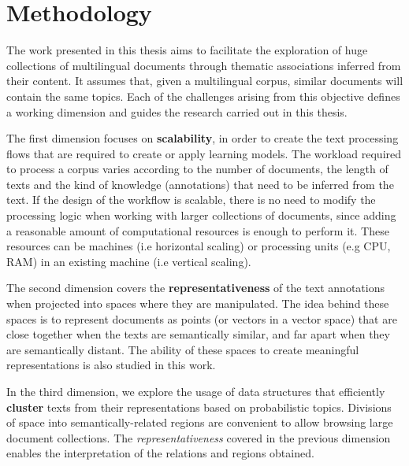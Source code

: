 

\chapter{Methodology}
\label{ch:hypothesis}

\graphicspath{{hypothesis/figures/}}


The work presented in this thesis aims to facilitate the exploration of huge collections of multilingual documents through thematic associations inferred from their content. It assumes that, given a multilingual corpus, similar documents will contain the same topics. Each of the challenges arising from this objective defines a working dimension and guides the research carried out in this thesis.

The first dimension focuses on \textbf{scalability}, in order to create the text processing flows that are required to create or apply learning models. The workload required to process a corpus varies according to the number of documents, the length of texts and the kind of knowledge (annotations) that need to be inferred from the text. If the design of the workflow is scalable, there is no need to modify the processing logic when working with larger collections of documents, since adding a reasonable amount of computational resources is enough to perform it. These resources can be machines (i.e horizontal scaling) or processing units (e.g CPU, RAM) in an existing machine (i.e vertical scaling). 

The second dimension covers the \textbf{representativeness} of the text annotations when projected into spaces where they are manipulated. The idea behind these spaces is to represent documents as points (or vectors in a vector space) that are close together when the texts are semantically similar, and far apart when they are semantically distant. The ability of these spaces to create meaningful representations is also studied in this work.

In the third dimension, we explore the usage of data structures that efficiently \textbf{cluster} texts from their representations based on probabilistic topics. Divisions of space into semantically-related regions are convenient to allow browsing large document collections. The \textit{representativeness} covered in the previous dimension enables the interpretation of the relations and regions obtained.

